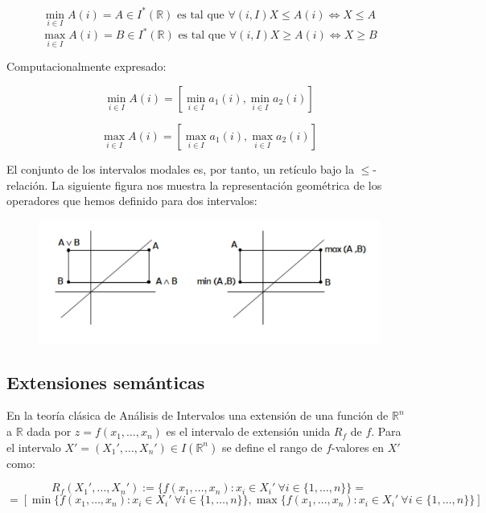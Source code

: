 \begin{equation}
\min_{i \in I} A(i) = A \in I^*(\mathbb{R}) \text{ es  tal que } \forall (i,I) X \leq A(i) \iff X \leq A
\nonumber
\end{equation}
\begin{equation}
\max_{i \in I} A(i) = B \in I^*(\mathbb{R}) \text{ es  tal que } \forall (i,I) X \geq A(i) \iff X \geq B
\nonumber
\end{equation}

Computacionalmente expresado:

\begin{equation}
\min_{i \in I} A(i) = [\min_{i \in I} a_1(i), \min_{i \in I} a_2(i)]
\nonumber
\end{equation}

\begin{equation}
\max_{i \in I} A(i) = [\max_{i \in I} a_1(i), \max_{i \in I} a_2(i)]
\nonumber
\end{equation}

El conjunto de los intervalos modales es, por tanto, un retículo bajo la $\leq$-relación. La siguiente figura nos muestra la representación geométrica de los operadores que hemos definido para dos intervalos:

\begin{figure}[h]
\centering
\includegraphics[scale=0.5]{images/florez12.png}
\end{figure}

\subsection{Extensiones semánticas}

En la teoría clásica de Análisis de Intervalos una extensión de una función de $\mathbb{R}^n$ a $\mathbb{R}$ dada por $z = f(x_1, \dotso, x_n)$ es el intervalo de extensión unida $R_f$ de $f$. Para el intervalo $X' = (X_1',\dotso, X_n') \in I(\mathbb{R}^n)$ se define el rango de $f$-valores en $X'$ como:

\begin{equation}
R_f(X_1',\dotso, X_n') := \{ f(x_1, \dotso, x_n) : x_i \in X_i' \ \forall i \in \{1, \dotso, n \} \} =
\nonumber
\end{equation}
\begin{equation}
= [\min \{ f(x_1, \dotso, x_n) : x_i \in X_i' \ \forall i \in \{1, \dotso, n \} \}, \max \{ f(x_1, \dotso, x_n) : x_i \in X_i' \ \forall i \in \{1, \dotso, n \} \}]
\nonumber
\end{equation}

